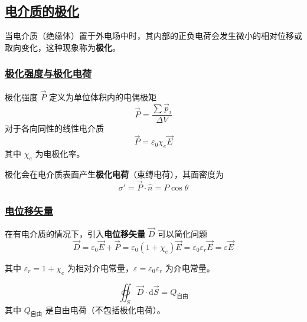\subsection{\protect\hyperlink{:}{电介质的极化}}

当电介质（绝缘体）置于外电场中时，其内部的正负电荷会发生微小的相对位移或取向变化，这种现象称为\textbf{极化}。

\subsubsection{\protect\hyperlink{:}{极化强度与极化电荷}}

\begin{definition}[极化强度]
    极化强度 $\vec{P}$ 定义为单位体积内的电偶极矩
    \begin{equation}
        \vec{P} = \frac{\sum \vec{p}_i}{\Delta V}
    \end{equation}
    对于各向同性的线性电介质
    \begin{equation}
        \vec{P} = \varepsilon_0 \chi_e \vec{E}
    \end{equation}
    其中 $\chi_e$ 为电极化率。
\end{definition}

极化会在电介质表面产生\textbf{极化电荷}（束缚电荷），其面密度为
\begin{equation}
    \sigma' = \vec{P} \cdot \hat{n} = P\cos\theta
\end{equation}

\subsubsection{\protect\hyperlink{:}{电位移矢量}}

在有电介质的情况下，引入\textbf{电位移矢量} $\vec{D}$ 可以简化问题
\begin{equation}
    \vec{D} = \varepsilon_0 \vec{E} + \vec{P} = \varepsilon_0(1 + \chi_e)\vec{E} = \varepsilon_0\varepsilon_r\vec{E} = \varepsilon\vec{E}
\end{equation}

其中 $\varepsilon_r = 1 + \chi_e$ 为相对介电常量，$\varepsilon = \varepsilon_0\varepsilon_r$ 为介电常量。

\begin{theorem}[有电介质时的高斯定理]
    \begin{equation}
        \oiint_S \vec{D} \cdot \mathrm{d}\vec{S} = Q_{\text{自由}}
    \end{equation}
    其中 $Q_{\text{自由}}$ 是自由电荷（不包括极化电荷）。
\end{theorem}

